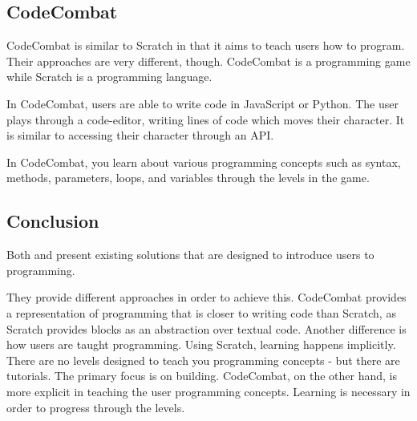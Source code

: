 \subsection{CodeCombat}\label{CodeCombatSection}
CodeCombat is similar to Scratch in that it aims to teach users how to program.
Their approaches are very different, though. CodeCombat is a programming game while Scratch is a programming language.

In CodeCombat, users are able to write code in JavaScript or Python\cite{CodeCombatCodingGames}. The user plays through a code-editor, writing lines of code which moves their character. It is similar to accessing their character through an API.

In CodeCombat, you learn about various programming concepts such as syntax, methods, parameters, loops, and variables through the levels in the game\cite{CodeCombatCodingGames}.

\subsection{Conclusion}
Both  and  present existing solutions that are designed to introduce users to programming.

They provide different approaches in order to achieve this. CodeCombat provides a representation of programming that is closer to writing code than Scratch, as Scratch provides blocks as an abstraction over textual code.
Another difference is how users are taught programming. Using Scratch, learning happens implicitly. There are no levels designed to teach you programming concepts - but there are tutorials. The primary focus is on building. CodeCombat, on the other hand, is more explicit in teaching the user programming concepts. Learning is necessary in order to progress through the levels.

